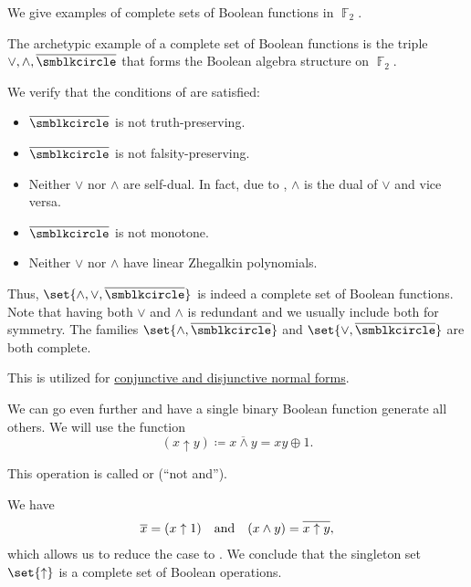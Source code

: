 \begin{example}\label{ex:thm:posts_completeness_theorem}
  We give examples of complete sets of Boolean functions in \( \BbbF_2 \).

  \begin{thmenum}
     The archetypic example of a complete set of Boolean functions is the triple \( \vee, \wedge, \overline{\anon} \) that forms the Boolean algebra structure on \( \BbbF_2 \).

    We verify that the conditions of  are satisfied:
    \begin{itemize}
      \item \( \overline{\anon} \) is not truth-preserving.
      \item \( \overline{\anon} \) is not falsity-preserving.
      \item Neither \( \vee \) nor \( \wedge \) are self-dual. In fact, due to , \( \wedge \) is the dual of \( \vee \) and vice versa.
      \item \( \overline{\anon} \) is not monotone.
      \item Neither \( \vee \) nor \( \wedge \) have linear Zhegalkin polynomials.
    \end{itemize}

    Thus, \( \set{ \wedge, \vee, \overline{\anon} } \) is indeed a complete set of Boolean functions. Note that having both \( \vee \) and \( \wedge \) is redundant and we usually include both for symmetry. The families \( \set{ \wedge, \overline{\anon} } \) and \( \set{ \vee, \overline{\anon} } \) are both complete.

    This is utilized for \hyperref[def:cnf_and_dnf]{conjunctive and disjunctive normal forms}.

     We can go even further and have a single binary Boolean function generate all others. We will use the function
    \begin{equation}\label{eq:ex:thm:posts_completeness_theorem/nand}
      (x \uparrow y) \coloneqq \overline{x \wedge y} = xy \oplus 1.
    \end{equation}

    This operation is called  or  (\enquote{not and}).

    We have
    \begin{equation*}
      \begin{array}{ccc}
        \overline{x} = (x \uparrow 1)
        &
        \T{and}
        &
        (x \wedge y) = \overline{x \uparrow y},
      \end{array}
    \end{equation*}
    which allows us to reduce the case to . We conclude that the singleton set \( \set{ \uparrow } \) is a complete set of Boolean operations.


\end{thmenum}
\end{example}

